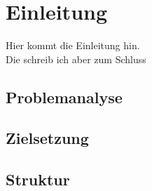 \section*{Einleitung}
Hier kommt die Einleitung hin. \\
Die schreib ich aber zum Schluss

\subsection*{Problemanalyse}
\subsection*{Zielsetzung}
\subsection*{Struktur}


\newpage

